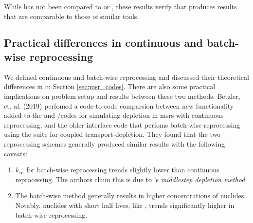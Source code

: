 While \SaltProc has not been compared to \SCALE or \ADDER, these results verify
that \SaltProc produces results that are comparable to those of similar tools.


\subsection{Practical differences in continuous and batch-wise reprocessing}
We defined continuous and batch-wise reprocessing and discussed their
theoretical differences in in Section \ref{sec:msr_codes}. There are also some
practical implications on problem setup and results between these two methods.
Betzler, et. al. (2019) \cite{betzler_molten_2019} perfomed a code-to-code
comparsion between new functionality added to the \ORIGEN and \SCALE/\TRITON codes
for simulating depletion in \Gls{msr}s with continuous reprocessing, and the
older \ChemTriton\cite{betzler_molten_2017} interface code that perfoms batch-wise reprocessing using
the \SCALE suite for coupled transport-depletion. They found that the two
reprocessing schemes generally produced similar results with the following
caveats:
\begin{enumerate}
    \item $k_{\infty}$ for batch-wise reprocessing trends slightly lower than  continuous reprocessing. The authors claim this is due to \SCALE's {\it middlestep depletion method}. 
    \item The batch-wise method generally results in higher concentrations of nuclides. Notably, nuclides with short half lives, like , trends significantly higher in batch-wise reprocessing.
\end{enumerate}


